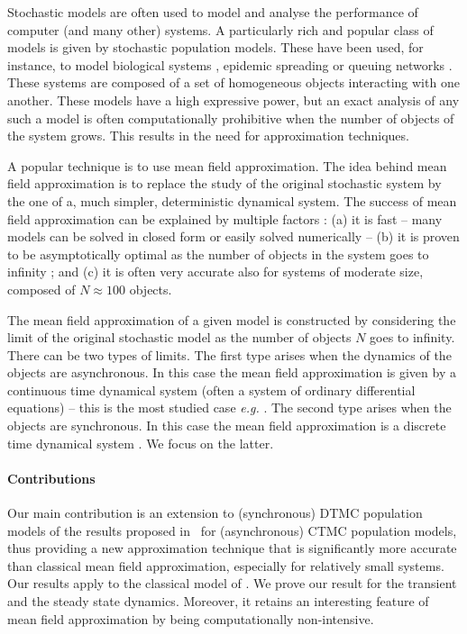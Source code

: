 \documentclass{elsarticle}
\begin{document}
Stochastic models are often used to model and analyse the performance
of computer (and many other) systems. A particularly rich and popular
class of models is given by stochastic population models. These have
been used, for instance, to model biological systems
\cite{wilkinson2006}, epidemic spreading \cite{andersson2000} or
queuing networks \cite{vvedenskaya1996queueing}. These systems are
composed of a set of homogeneous objects interacting with one
another. These models have a high expressive power, but an exact
analysis of any such a model is often computationally prohibitive when
the number of objects of the system grows. This results in the need
for approximation techniques.

A popular technique is to use mean field approximation. The idea
behind mean field approximation is to replace the study of the
original stochastic system by the one of a, much simpler,
deterministic dynamical system.  The success of mean field
approximation can be explained by multiple factors : (a) it is fast --
many models can be solved in closed form
\cite{vvedenskaya1996queueing,mitzenmacher2001power,tsitsiklis2011power,minnebo2}
or easily solved numerically
\cite{massoulie1,gast2010mean,van2013mean} -- (b) it is proven to be
asymptotically optimal as the number of objects in the system goes to
infinity
\cite{kurtz70,Le+07,benaim2008class,gast2012markov,BHLM13};
and (c) it is often very accurate also for systems of moderate size,
composed of $N\approx100$ objects.

The mean field approximation of a given model is constructed by
considering the limit of the original stochastic model as the number
of objects $N$ goes to infinity. There can be two types of limits. The
first type arises when the dynamics of the objects are
asynchronous. In this case the mean field approximation is given by a
continuous time dynamical system (often a system of ordinary
differential equations) -- this is the most studied case \emph{e.g.}
\cite{kurtz70,benaim2008class,BHLM13}.  The second
type arises when the objects are synchronous. In this case
the mean field approximation is a discrete time dynamical system
\cite{Le+07,gastgaujalDEDS,tinnakornsrisuphap2003limit}. We focus on
the latter.

\paragraph*{Contributions}
Our main contribution is an extension to (synchronous) DTMC population models of the results 
proposed in~\cite{gast2017refined} for (asynchronous) CTMC population models, thus providing a new approximation technique that is significantly more accurate than classical mean field approximation, especially for relatively small systems.
Our results apply to the classical model of
\cite{Le+07,gastgaujalDEDS,latella2013fly}. We prove our result for
the transient and the steady state dynamics. Moreover, it retains an
interesting feature of mean field approximation by being
computationally non-intensive.
\end{document}
